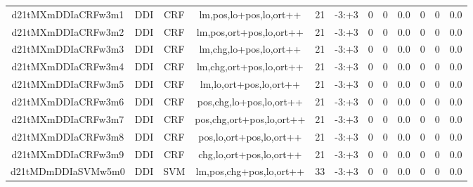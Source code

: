 \documentclass[a4paper]{article}
\begin{document}
\begin{landscape}
\begin{center}
\begin{tabular}{ |c|c|c|c|c|c|c|c|c|c|c|c|}
 
 	
 	\small{ d21tMXmDDIaCRFw3m1 } & \small{ DDI} & \small{  CRF }  & lm,pos,lo+pos,lo,ort++  &  21 &  \small{  -3:+3 }  &  0 & 0 & 0.0  &  0 & 0 & 0.0 \\
 	

 
 	
 	\small{ d21tMXmDDIaCRFw3m2 } & \small{ DDI} & \small{  CRF }  & lm,pos,ort+pos,lo,ort++  &  21 &  \small{  -3:+3 }  &  0 & 0 & 0.0  &  0 & 0 & 0.0 \\
 	

 
 	
 	\small{ d21tMXmDDIaCRFw3m3 } & \small{ DDI} & \small{  CRF }  & lm,chg,lo+pos,lo,ort++  &  21 &  \small{  -3:+3 }  &  0 & 0 & 0.0  &  0 & 0 & 0.0 \\
 	

 
 	
 	\small{ d21tMXmDDIaCRFw3m4 } & \small{ DDI} & \small{  CRF }  & lm,chg,ort+pos,lo,ort++  &  21 &  \small{  -3:+3 }  &  0 & 0 & 0.0  &  0 & 0 & 0.0 \\
 	

 
 	
 	\small{ d21tMXmDDIaCRFw3m5 } & \small{ DDI} & \small{  CRF }  & lm,lo,ort+pos,lo,ort++  &  21 &  \small{  -3:+3 }  &  0 & 0 & 0.0  &  0 & 0 & 0.0 \\
 	

 
 	
 	\small{ d21tMXmDDIaCRFw3m6 } & \small{ DDI} & \small{  CRF }  & pos,chg,lo+pos,lo,ort++  &  21 &  \small{  -3:+3 }  &  0 & 0 & 0.0  &  0 & 0 & 0.0 \\
 	

 
 	
 	\small{ d21tMXmDDIaCRFw3m7 } & \small{ DDI} & \small{  CRF }  & pos,chg,ort+pos,lo,ort++  &  21 &  \small{  -3:+3 }  &  0 & 0 & 0.0  &  0 & 0 & 0.0 \\
 	

 
 	
 	\small{ d21tMXmDDIaCRFw3m8 } & \small{ DDI} & \small{  CRF }  & pos,lo,ort+pos,lo,ort++  &  21 &  \small{  -3:+3 }  &  0 & 0 & 0.0  &  0 & 0 & 0.0 \\
 	

 
 	
 	\small{ d21tMXmDDIaCRFw3m9 } & \small{ DDI} & \small{  CRF }  & chg,lo,ort+pos,lo,ort++  &  21 &  \small{  -3:+3 }  &  0 & 0 & 0.0  &  0 & 0 & 0.0 \\
 	

 
 	
 	\small{ d21tMDmDDIaSVMw5m0 } & \small{ DDI} & \small{  SVM }  & lm,pos,chg+pos,lo,ort++  &  33 &  \small{  -3:+3 }  &  0 & 0 & 0.0  &  0 & 0 & 0.0 \\
 	


\end{tabular}
\end{center}
\end{landscape}
\end{document}
